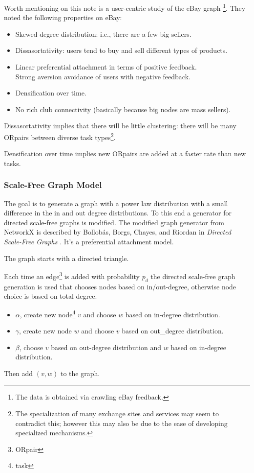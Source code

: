 \documentclass[main.tex]{subfiles}
\begin{document}
Worth mentioning on this note is a user-centric study of the eBay graph \cite{ebay}\footnote{The data is obtained via crawling eBay feedback.}. They noted the following properties on eBay:

\begin{itemize}
  \item Skewed degree distribution: i.e., there are a few big sellers.
  \item Dissasortativity: users tend to buy and sell different types of products.
  \item Linear preferential attachment in terms of positive feedback.
     \\ Strong aversion avoidance of users with negative feedback.
  \item Densification over time.
  \item No rich club connectivity (basically because big nodes are mass sellers).
\end{itemize}

Dissasortativity implies that there will be little clustering: there will be many ORpairs between diverse task types\footnote{The specialization of many exchange sites and services may seem to contradict this; however this may also be due to the ease of developing specialized mechanisms.}.

Densification over time implies new ORpairs are added at a faster rate than new tasks.

\subsubsection{Scale-Free Graph Model}
The goal is to generate a graph with a power law distribution with a small difference in the in and out degree distributions. To this end a generator for directed scale-free graphs is modified. The modified graph generator from NetworkX \cite{netX} is described by Bollobás, Borgs, Chayes, and Riordan in \textit{Directed Scale-Free Graphs} \cite{Bol}. It's a preferential attachment model.

The graph starts with a directed triangle.

Each time an edge\footnote{ORpair} is added with probability $p_d$ the directed scale-free graph generation is used that chooses nodes based on in/out-degree, otherwise node choice is based on total degree.
\begin{itemize}
  \item $\alpha$, create new node\footnote{task} $v$ and choose $w$ based on in-degree distribution.
  \item $\gamma$, create new node $w$ and choose $v$ based on out\_degree distribution.
  \item $\beta$, choose $v$ based on out-degree distribution and $w$ based on in-degree distribution.
\end{itemize}
Then add $(v,w)$ to the graph.
\end{document}
